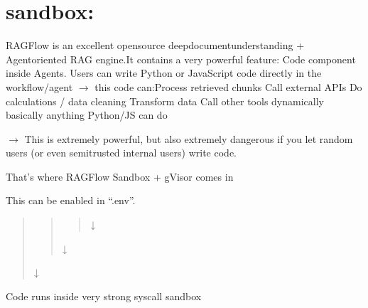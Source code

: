\documentclass[letterpaper,10pt,english]{sphinxmanual}
\begin{document}
\section{sandbox:}
\label{\detokenize{security-concerns:sandbox}}
\sphinxAtStartPar
RAGFlow is an excellent open\sphinxhyphen{}source deep\sphinxhyphen{}document\sphinxhyphen{}understanding + Agent\sphinxhyphen{}oriented RAG engine.It contains a very powerful feature: Code component inside Agents. Users can write Python or JavaScript code directly in the workflow/agent \(\rightarrow\) this code can:Process retrieved chunks
Call external APIs
Do calculations / data cleaning
Transform data
Call other tools dynamically basically anything Python/JS can do

\sphinxAtStartPar
\(\rightarrow\) This is extremely powerful, but also extremely dangerous if you let random users (or even semi\sphinxhyphen{}trusted internal users) write code.

\sphinxAtStartPar
That’s where RAGFlow Sandbox + gVisor comes in

\sphinxAtStartPar
This can be enabled in “.env”.
\begin{description}
\begin{quote}
\begin{quote}
\begin{quote}

\sphinxAtStartPar
↓
\end{quote}
\begin{description}
\sphinxAtStartPar
↓

\end{description}
\end{quote}
\begin{description}
\begin{description}
\sphinxAtStartPar
↓

\end{description}

\end{description}
\end{quote}

\sphinxAtStartPar
Code runs inside very strong syscall sandbox

\end{description}
\end{document}
